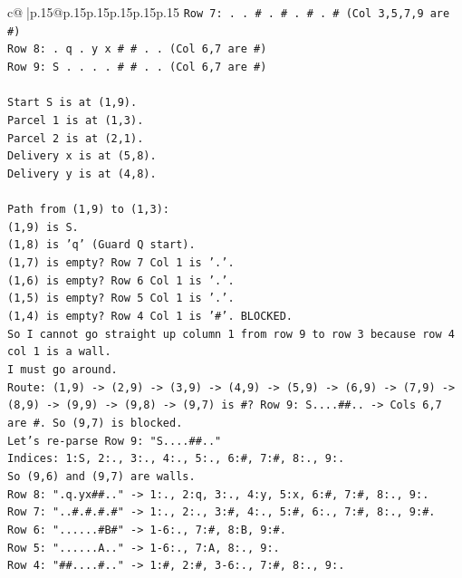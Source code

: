 \documentclass{article}
\begin{document}
{\begin{supertabular}{c@{$\;$}|p{.15\linewidth}@{}p{.15\linewidth}p{.15\linewidth}p{.15\linewidth}p{.15\linewidth}p{.15\linewidth}}
{{{\texttt{Row 7: . . \# . \# . \# . \# (Col 3,5,7,9 are \#)} \\
\texttt{Row 8: . q . y x \# \# . . (Col 6,7 are \#)} \\
\texttt{Row 9: S . . . . \# \# . . (Col 6,7 are \#)} \\
\\ 
\texttt{Start S is at (1,9).} \\
\texttt{Parcel 1 is at (1,3).} \\
\texttt{Parcel 2 is at (2,1).} \\
\texttt{Delivery x is at (5,8).} \\
\texttt{Delivery y is at (4,8).} \\
\\ 
\texttt{Path from (1,9) to (1,3):} \\
\texttt{(1,9) is S.} \\
\texttt{(1,8) is 'q' (Guard Q start).} \\
\texttt{(1,7) is empty? Row 7 Col 1 is '.'.} \\
\texttt{(1,6) is empty? Row 6 Col 1 is '.'.} \\
\texttt{(1,5) is empty? Row 5 Col 1 is '.'.} \\
\texttt{(1,4) is empty? Row 4 Col 1 is '\#'. BLOCKED.} \\
\texttt{So I cannot go straight up column 1 from row 9 to row 3 because row 4 col 1 is a wall.} \\
\texttt{I must go around.} \\
\texttt{Route: (1,9) {-}> (2,9) {-}> (3,9) {-}> (4,9) {-}> (5,9) {-}> (6,9) {-}> (7,9) {-}> (8,9) {-}> (9,9) {-}> (9,8) {-}> (9,7) is \#? Row 9: S....\#\#.. {-}> Cols 6,7 are \#. So (9,7) is blocked.} \\
\texttt{Let's re{-}parse Row 9: "S....\#\#.."} \\
\texttt{Indices: 1:S, 2:., 3:., 4:., 5:., 6:\#, 7:\#, 8:., 9:.} \\
\texttt{So (9,6) and (9,7) are walls.} \\
\texttt{Row 8: ".q.yx\#\#.." {-}> 1:., 2:q, 3:., 4:y, 5:x, 6:\#, 7:\#, 8:., 9:.} \\
\texttt{Row 7: "..\#.\#.\#.\#" {-}> 1:., 2:., 3:\#, 4:., 5:\#, 6:., 7:\#, 8:., 9:\#.} \\
\texttt{Row 6: "......\#B\#" {-}> 1{-}6:., 7:\#, 8:B, 9:\#.} \\
\texttt{Row 5: "......A.." {-}> 1{-}6:., 7:A, 8:., 9:.} \\
\texttt{Row 4: "\#\#....\#.." {-}> 1:\#, 2:\#, 3{-}6:., 7:\#, 8:., 9:.} \\
}}}
\end{supertabular}}
\end{document}
